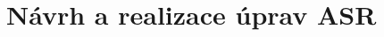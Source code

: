 \ifdefined\CELE
\else

\fi

\chapter{Návrh a realizace úprav ASR}
\label{chap:realisation}












\ifdefined\CELE
\else

\fi
